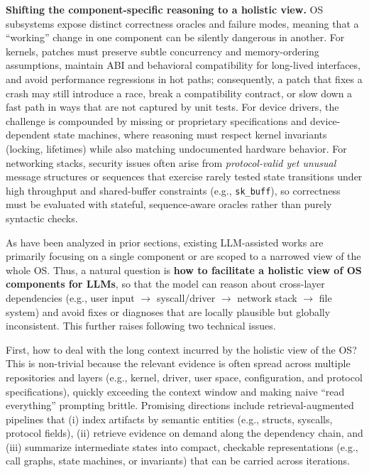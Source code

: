 \textbf{Shifting the component-specific reasoning to a holistic view.}
OS subsystems expose distinct correctness oracles and failure modes, meaning that a ``working'' change in one component can be silently dangerous in another.
For kernels, patches must preserve subtle concurrency and memory-ordering assumptions, maintain ABI and behavioral compatibility for long-lived interfaces, and avoid performance regressions in hot paths; consequently, a patch that fixes a crash may still introduce a race, break a compatibility contract, or slow down a fast path in ways that are not captured by unit tests.
For device drivers, the challenge is compounded by missing or proprietary specifications and device-dependent state machines, where reasoning must respect kernel invariants (locking, lifetimes) while also matching undocumented hardware behavior.
For networking stacks, security issues often arise from \emph{protocol-valid yet unusual} message structures or sequences that exercise rarely tested state transitions under high throughput and shared-buffer constraints (e.g., \texttt{sk\_buff}), so correctness must be evaluated with stateful, sequence-aware oracles rather than purely syntactic checks.

As have been analyzed in prior sections, existing LLM-assisted works are primarily focusing on a single component or are scoped to a narrowed view of the whole OS. 
Thus, a natural question is \textbf{how to facilitate a holistic view of OS components for LLMs}, so that the model can reason about cross-layer dependencies (e.g., user input $\rightarrow$ syscall/driver $\rightarrow$ network stack $\rightarrow$ file system) and avoid fixes or diagnoses that are locally plausible but globally inconsistent. 
This further raises following two technical issues. 

First, how to deal with the long context incurred by the holistic view of the OS? 
This is non-trivial because the relevant evidence is often spread across multiple repositories and layers (e.g., kernel, driver, user space, configuration, and protocol specifications), quickly exceeding the context window and making naive ``read everything'' prompting brittle.
Promising directions include retrieval-augmented pipelines that (i) index artifacts by semantic entities (e.g., structs, syscalls, protocol fields), (ii) retrieve evidence on demand along the dependency chain, and (iii) summarize intermediate states into compact, checkable representations (e.g., call graphs, state machines, or invariants) that can be carried across iterations.


